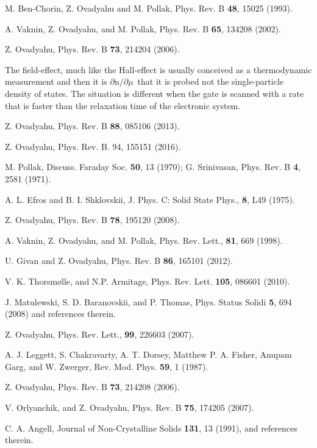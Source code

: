 \documentclass
[preprint,showpacs,byrevtex,10pt,twocolumn,tightenlines,prl,letterpaper]{revtex4}%
\begin{document}
\begin{thebibliography}{99}
M. Ben-Chorin, Z. Ovadyahu and M. Pollak, Phys. Rev. B\textbf{
48}, 15025 (1993).

A. Vaknin, Z. Ovadyahu, and M. Pollak, Phys. Rev. B\textbf{ 65},
134208 (2002).

Z. Ovadyahu, Phys. Rev. B \textbf{73}, 214204 (2006).

The field-effect, much like the Hall-effect is usually conceived
as a thermodynamic measurement and then it is $\partial$n$/\partial\mu$~that
it is probed not the single-particle density of states. The situation is
different when the gate is scanned with a rate that is faster than the
relaxation time of the electronic system.

Z. Ovadyahu, Phys. Rev. B \textbf{88}, 085106 (2013).

Z. Ovadyahu, Phys. Rev. B. 94, 155151 (2016).

M. Pollak, Discuss. Faraday Soc. \textbf{50}, 13 (1970); G.
Srinivasan, Phys. Rev. B \textbf{4}, 2581 (1971).

A. L. Efros and B. I. Shklovskii, J. Phys. C: Solid State Phys.,
\textbf{8}, L49 (1975).

Z. Ovadyahu, Phys. Rev. B \textbf{78}, 195120 (2008).

A. Vaknin, Z. Ovadyahu, and M. Pollak, Phys. Rev. Lett.,
\textbf{81}, 669 (1998).

U. Givan and Z. Ovadyahu, Phys. Rev. B \textbf{86}, 165101 (2012).

V. K. Thorsm\o lle, and N.P. Armitage, Phys. Rev. Lett.
\textbf{105}, 086601 (2010).

J. Matulewski, S. D. Baranovskii, and P. Thomas, Phys. Status
Solidi \textbf{5}, 694 (2008) and references therein.

Z. Ovadyahu, Phys. Rev. Lett., \textbf{99}, 226603 (2007).

A. J. Leggett, S. Chakravarty, A. T. Dorsey, Matthew P. A.
Fisher, Anupam Garg, and W. Zwerger, Rev. Mod. Phys. \textbf{59}, 1 (1987).

Z. Ovadyahu, Phys. Rev. B \textbf{73}, 214208 (2006).

V. Orlyanchik, and Z. Ovadyahu, Phys. Rev. B \textbf{75}, 174205 (2007).

C. A. Angell, Journal of Non-Crystalline Solids \textbf{131}, 13
(1991), and references therein.


\end{thebibliography}
\end{document}
